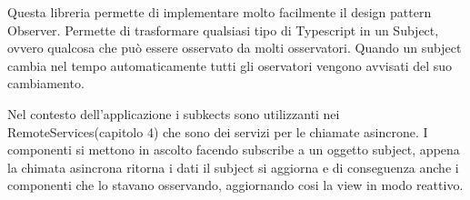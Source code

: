Questa libreria permette di implementare molto facilmente il design pattern Observer. Permette di trasformare qualsiasi tipo di Typescript in un Subject, ovvero qualcosa che può essere osservato da molti osservatori. Quando un subject cambia nel tempo automaticamente tutti gli oservatori vengono avvisati del suo cambiamento. 

Nel contesto dell'applicazione i subkects sono utilizzanti nei  RemoteServices(capitolo 4) che sono dei servizi per le chiamate asincrone. I componenti si mettono in ascolto facendo subscribe a un oggetto subject, appena la chimata asincrona ritorna i dati il subject si aggiorna e di conseguenza anche i componenti che lo stavano osservando, aggiornando cosi la view in modo reattivo. 